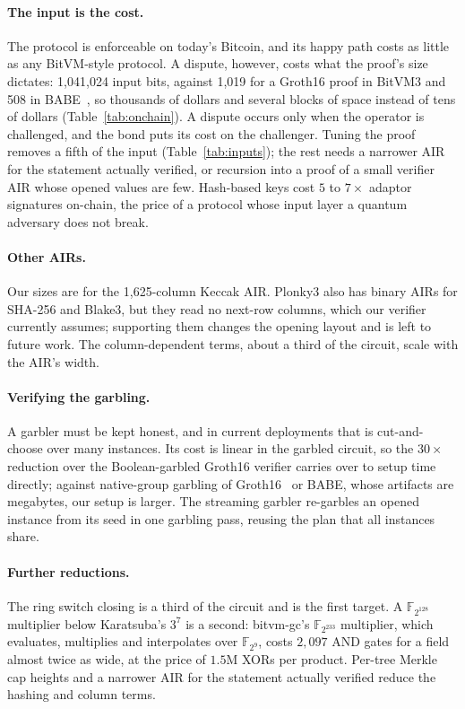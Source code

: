 \documentclass[11pt]{article}
\newcommand{\F}{\mathbb{F}_{2^{128}}}
\newcommand{\AND}{\textsf{AND}}
\newcommand{\XOR}{\textsf{XOR}}
\begin{document}
\paragraph{The input is the cost.} The protocol is enforceable on today's
Bitcoin, and its happy path costs as little as any BitVM-style protocol. A
dispute, however, costs what the proof's size dictates: 1{,}041{,}024 input bits,
against 1{,}019 for a Groth16 proof in BitVM3 and 508 in BABE~\cite{babe2026}, so
thousands of dollars and several blocks of space instead of tens of dollars
(Table~\ref{tab:onchain}). A dispute occurs only when the operator is
challenged, and the bond puts its cost on the challenger. Tuning the proof
removes a fifth of the input (Table~\ref{tab:inputs}); the rest needs a narrower
AIR for the statement actually verified, or recursion into a proof of a small
verifier AIR whose opened values are few. Hash-based keys cost $5$ to $7\times$
adaptor signatures on-chain, the price of a protocol whose input layer a quantum
adversary does not break.

\paragraph{Other AIRs.} Our sizes are for the 1{,}625-column Keccak AIR. Plonky3
also has binary AIRs for SHA-256 and Blake3, but they read no next-row columns,
which our verifier currently assumes; supporting them changes the opening layout
and is left to future work. The column-dependent terms, about a third of the
circuit, scale with the AIR's width.

\paragraph{Verifying the garbling.} A garbler must be kept honest, and in
current deployments that is cut-and-choose over many instances. Its cost is
linear in the garbled circuit, so the $30\times$ reduction over the
Boolean-garbled Groth16 verifier carries over to setup time directly; against
native-group garbling of Groth16~\cite{kflt26native} or BABE, whose artifacts are
megabytes, our setup is larger. The streaming garbler
re-garbles an opened instance from its seed in one garbling pass, reusing the
plan that all instances share.

\paragraph{Further reductions.} The ring switch closing is a third of the
circuit and is the first target. A $\F$ multiplier below Karatsuba's
$3^7$ is a second: bitvm-gc's $\mathbb{F}_{2^{233}}$ multiplier, which evaluates,
multiplies and interpolates over $\mathbb{F}_{2^9}$, costs $2{,}097$ \AND{} gates
for a field almost twice as wide, at the price of $1.5$M \XOR{}s per product.
Per-tree Merkle cap heights and a narrower AIR for the statement actually
verified reduce the hashing and column terms.
\end{document}
